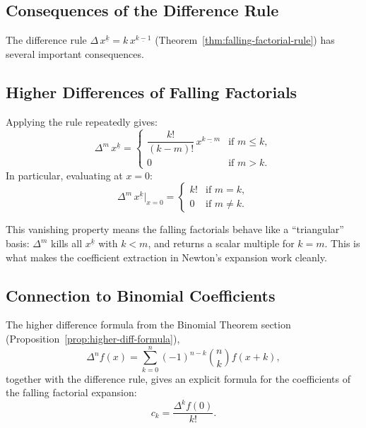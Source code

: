 
\subsection*{Consequences of the Difference Rule}

The difference rule \(\Delta\,x^{\underline{k}} = k\,x^{\underline{k-1}}\)
(Theorem~\ref{thm:falling-factorial-rule}) has several important consequences.

\subsection*{Higher Differences of Falling Factorials}

Applying the rule repeatedly gives:
\[
\Delta^m\, x^{\underline{k}}
=
\begin{cases}
\dfrac{k!}{(k-m)!}\, x^{\underline{k-m}} & \text{if } m \le k, \\[6pt]
0 & \text{if } m > k.
\end{cases}
\]
In particular, evaluating at \(x = 0\):
\[
\Delta^m\, x^{\underline{k}}\big|_{x=0}
=
\begin{cases}
k! & \text{if } m = k, \\
0 & \text{if } m \ne k.
\end{cases}
\]

\begin{remark*}
This vanishing property means the falling factorials behave like a
``triangular'' basis: \(\Delta^m\) kills all \(x^{\underline{k}}\) with
\(k < m\), and returns a scalar multiple for \(k = m\). This is what
makes the coefficient extraction in Newton's expansion work cleanly.
\end{remark*}

\subsection*{Connection to Binomial Coefficients}

The higher difference formula from the Binomial Theorem section
(Proposition~\ref{prop:higher-diff-formula}),
\[
\Delta^n f(x) = \sum_{k=0}^{n}(-1)^{n-k}\binom{n}{k}f(x+k),
\]
together with the difference rule, gives an explicit formula for the
coefficients of the falling factorial expansion:
\[
c_k = \frac{\Delta^k f(0)}{k!}.
\]

